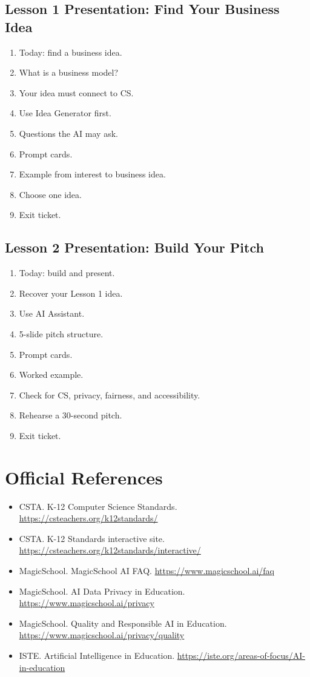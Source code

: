 \documentclass[11pt]{article}
\begin{document}
\subsection{Lesson 1 Presentation: Find Your Business Idea}
\begin{enumerate}
  \item Today: find a business idea.
  \item What is a business model?
  \item Your idea must connect to CS.
  \item Use Idea Generator first.
  \item Questions the AI may ask.
  \item Prompt cards.
  \item Example from interest to business idea.
  \item Choose one idea.
  \item Exit ticket.
\end{enumerate}

\subsection{Lesson 2 Presentation: Build Your Pitch}
\begin{enumerate}
  \item Today: build and present.
  \item Recover your Lesson 1 idea.
  \item Use AI Assistant.
  \item 5-slide pitch structure.
  \item Prompt cards.
  \item Worked example.
  \item Check for CS, privacy, fairness, and accessibility.
  \item Rehearse a 30-second pitch.
  \item Exit ticket.
\end{enumerate}

\section{Official References}
\begin{itemize}
  \item CSTA. K-12 Computer Science Standards. \url{https://csteachers.org/k12standards/}
  \item CSTA. K-12 Standards interactive site. \url{https://csteachers.org/k12standards/interactive/}
  \item MagicSchool. MagicSchool AI FAQ. \url{https://www.magicschool.ai/faq}
  \item MagicSchool. AI Data Privacy in Education. \url{https://www.magicschool.ai/privacy}
  \item MagicSchool. Quality and Responsible AI in Education. \url{https://www.magicschool.ai/privacy/quality}
  \item ISTE. Artificial Intelligence in Education. \url{https://iste.org/areas-of-focus/AI-in-education}
\end{itemize}
\end{document}
